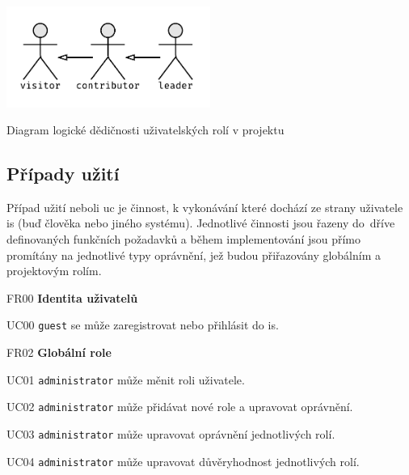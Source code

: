 \begin{fig:illustration}
   \includegraphics[width=0.5\textwidth]{images/dia-actors-project.pdf}
   \caption{Diagram logické dědičnosti uživatelských rolí v projektu}\label{pic:dia-actors-project}
\end{fig:illustration}



\subsection{Případy užití}

Případ užití neboli \gls{uc} je činnost, k vykonávání které dochází ze strany uživatele \gls{is} (buď člověka nebo jiného systému). Jednotlivé činnosti jsou řazeny do~dříve definovaných funkčních požadavků a během implementování jsou přímo promítány na jednotlivé typy oprávnění, jež budou přiřazovány globálním a projektovým rolím.


\begin{dlnar}
   \item[FR00] \textbf{Identita uživatelů}

   \begin{dlnar}
      \item[UC00]
      \texttt{guest} se může zaregistrovat nebo přihlásit do \gls{is}.
   \end{dlnar}
\end{dlnar}



\begin{dlnar}
   \item[FR02] \textbf{Globální role}

   \begin{dlnar}
      \item[UC01] 
      \texttt{administrator} může měnit roli uživatele. 

      \item[UC02] 
      \texttt{administrator} může přidávat nové role a upravovat oprávnění. 

      \item[UC03]
      \texttt{administrator} může upravovat oprávnění jednotlivých rolí.

      \item[UC04] 
      \texttt{administrator} může upravovat důvěryhodnost jednotlivých rolí.
   \end{dlnar}
\end{dlnar}


